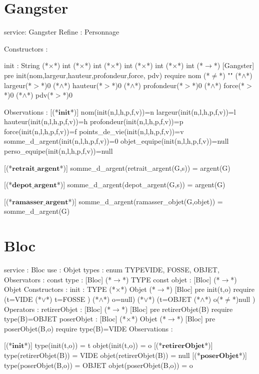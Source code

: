 \documentclass[a4paper, 11pt]{report}
\newcommand{\specB}[1]{\textbf{#1}}
\begin{document}
\section{Gangster}
\begin{Spe}
service: Gangster
Refine : Personnage

Constructors : 

	init : String (*$\times$*) int (*$\times$*) int (*$\times$*) int (*$\times$*) int (*$\times$*) int  (*$\rightarrow$*) [Gangster]
		pre init(nom,largeur,hauteur,profondeur,force, pdv) require nom (*$\neq$*) "" (*$\land$*) largeur(*$>$*)0 (*$\land$*) hauteur(*$>$*)0 (*$\land$*) profondeur(*$>$*)0 (*$\land$*) force(*$>$*)0 (*$\land$*) pdv(*$>$*)0 
		
Observations :
	[(*$\specB{init}$*)]
		nom(init(n,l,h,p,f,v))=n
		largeur(init(n,l,h,p,f,v))=l
		hauteur(init(n,l,h,p,f,v))=h
		profondeur(init(n,l,h,p,f,v))=p
		force(init(n,l,h,p,f,v))=f
		points_de_vie(init(n,l,h,p,f,v))=v
		somme_d_argent(init(n,l,h,p,f,v))=0
		objet_equipe(init(n,l,h,p,f,v))=null
		perso_equipe(init(n,l,h,p,f,v))=null
		
	[(*$\specB{retrait\_argent}$*)]
		somme_d_argent(retrait_argent(G,s)) = argent(G)
		
	[(*$\specB{depot\_argent}$*)]
		somme_d_argent(depot_argent(G,s)) = argent(G) 

	[(*$\specB{ramasser\_argent}$*)]
		somme_d_argent(ramasser_objet(G,objet)) = somme_d_argent(G)
					
\end{Spe}

\section{Bloc}
\begin{Spe}
service : Bloc
use : Objet
types : enum TYPE{VIDE, FOSSE, OBJET},
Observators :
      const type : [Bloc] (*$\rightarrow$*) TYPE
      const objet : [Bloc] (*$\rightarrow$*) Objet
Constructors :
      init : TYPE (*$\times$*) Objet (*$\rightarrow$*) [Bloc]
	    pre init(t,o) require 
	    (t=VIDE (*$\lor$*) t=FOSSE ) (*$\land$*) o=null) (*$\lor$*) (t=OBJET (*$\land$*) o(*$\ne$*)null ) 
Operators :
      retirerObjet : [Bloc] (*$\rightarrow$*) [Bloc]
	    pre retirerObjet(B) require type(B)=OBJET
      poserObjet : [Bloc] (*$\times$*) Objet (*$\rightarrow$*) [Bloc]
	    pre poserObjet(B,o) require type(B)=VIDE 
Observations :
     
      [(*$\specB{init}$*)]
	    type(init(t,o)) = t
	    objet(init(t,o)) = o
      [(*$\specB{retirerObjet}$*)]
	    type(retirerObjet(B)) = VIDE
	    objet(retirerObjet(B)) = null
      [(*$\specB{poserObjet}$*)] 
	    type(poserObjet(B,o)) = OBJET
	    objet(poserObjet(B,o)) = o 
     
\end{Spe}
 
\end{document}

